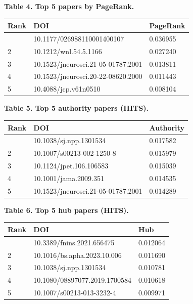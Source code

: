 \documentclass[
  english,
]{article}
\newcounter{none} %
\begin{document}
\textbf{Table 4. Top 5 papers by PageRank.}

{\def\LTcaptype{none} %
\begin{longtable}[]{@{}lll@{}}
\toprule\noalign{}
Rank & DOI & PageRank \\
\midrule\noalign{}
\endhead
\bottomrule\noalign{}
\endlastfoot
1 & 10.1177/026988110001400107 & 0.036955 \\
2 & 10.1212/wnl.54.5.1166 & 0.027240 \\
3 & 10.1523/jneurosci.21-05-01787.2001 & 0.013811 \\
4 & 10.1523/jneurosci.20-22-08620.2000 & 0.011443 \\
5 & 10.4088/jcp.v61n0510 & 0.008104 \\
\end{longtable}
}

\textbf{Table 5. Top 5 authority papers (HITS).}

{\def\LTcaptype{none} %
\begin{longtable}[]{@{}lll@{}}
\toprule\noalign{}
Rank & DOI & Authority \\
\midrule\noalign{}
\endhead
\bottomrule\noalign{}
\endlastfoot
1 & 10.1038/sj.npp.1301534 & 0.017582 \\
2 & 10.1007/s00213-002-1250-8 & 0.015979 \\
3 & 10.1124/jpet.106.106583 & 0.015039 \\
4 & 10.1001/jama.2009.351 & 0.014535 \\
5 & 10.1523/jneurosci.21-05-01787.2001 & 0.014289 \\
\end{longtable}
}

\textbf{Table 6. Top 5 hub papers (HITS).}

{\def\LTcaptype{none} %
\begin{longtable}[]{@{}lll@{}}
\toprule\noalign{}
Rank & DOI & Hub \\
\midrule\noalign{}
\endhead
\bottomrule\noalign{}
\endlastfoot
1 & 10.3389/fnins.2021.656475 & 0.012064 \\
2 & 10.1016/bs.apha.2023.10.006 & 0.011690 \\
3 & 10.1038/sj.npp.1301534 & 0.010781 \\
4 & 10.1080/08897077.2019.1700584 & 0.010618 \\
5 & 10.1007/s00213-013-3232-4 & 0.009971 \\
\end{longtable}
}
\end{document}

